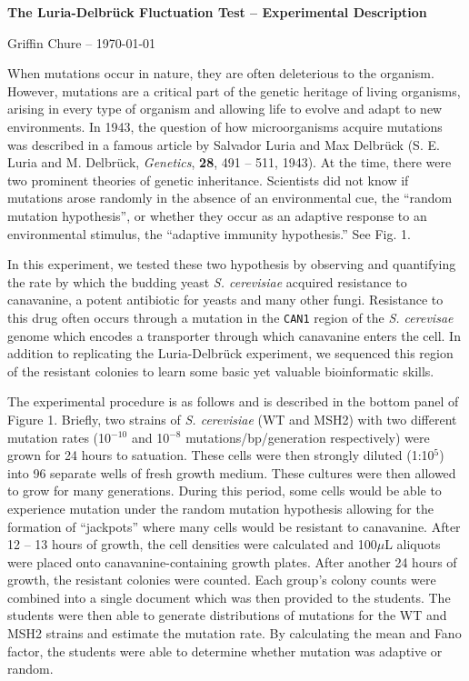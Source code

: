 \documentclass[letterpaper, 12pt]{article}
\begin{document}
\centerline{\large \textbf{The Luria-Delbr\"{u}ck Fluctuation Test --
Experimental Description}}

\centerline{\small Griffin Chure -- \today}
\vspace*{2em}
When mutations occur in nature, they are often deleterious to the organism.
However, mutations are a critical part of the genetic heritage of living
organisms, arising in every type of organism and allowing life to evolve and
adapt to new environments. In 1943, the question of how microorganisms acquire
mutations was described in a famous article by Salvador Luria and Max Delbr\"{u}ck
(S. E. Luria and M. Delbr\"{u}ck, {\em Genetics}, {\bf 28}, 491 -- 511, 1943). At the time, there
were two prominent theories of genetic inheritance. Scientists did not know if
mutations arose randomly in the absence of an environmental cue, the ``random
mutation hypothesis'', or whether they occur as an adaptive response to an
environmental stimulus, the ``adaptive immunity hypothesis.'' See Fig. 1.


In this experiment, we tested these two hypothesis by observing and quantifying
the rate by which the budding yeast \textit{S. cerevisiae} acquired resistance
to canavanine, a potent antibiotic for yeasts and many other fungi. Resistance
to this drug often occurs through a mutation in the \texttt{CAN1} region of the
\textit{S. cerevisae} genome which encodes a transporter through which
canavanine enters the cell. In addition to replicating the Luria-Delbr\"{u}ck
experiment, we sequenced this region of the resistant colonies to learn some
basic yet valuable bioinformatic skills.  


The experimental procedure is as follows and is described in the bottom panel of
Figure 1. Briefly, two strains of \textit{S. cerevisiae} (WT and MSH2) with two
different mutation rates (10$^{-10}$ and 10$^{-8}$ mutations/bp/generation
respectively) were grown for 24 hours to satuation. These cells were then
strongly diluted (1:10$^{5}$) into 96 separate wells of fresh growth medium.
These cultures were then allowed to grow for many generations. During this
period, some cells would be able to experience mutation under the random
mutation hypothesis allowing for the formation of ``jackpots'' where many cells
would be resistant to canavanine. After 12 -- 13 hours of growth, the cell densities
were calculated and 100$\mu$L aliquots were placed onto canavanine-containing
growth plates. After another 24 hours of growth, the resistant colonies were
counted. Each group's colony counts were combined into a single document which
was then provided to the students. The students were then able to generate
distributions of mutations for the WT and MSH2 strains and estimate the mutation
rate. By calculating the mean and Fano factor, the students were able to
determine whether mutation was adaptive or random.
\end{document}
